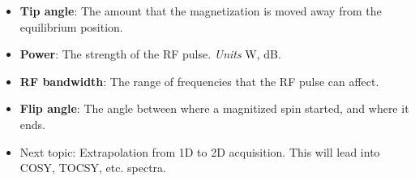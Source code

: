 \documentclass[../notes.tex]{subfiles}
\begin{document}
\begin{itemize}
\begin{itemize}
\begin{itemize}
        \end{itemize}
        \item RF pulses are defined by their \textbf{frequency}, \textbf{tip angle}, \textbf{power}, \textbf{RF bandwidth}, and \textbf{phase}.
        \item When we apply a strong pulse, it excites a wide bandwidth. Weak pulses, on the contrary, excite a narrow bandwidth.
        \item Relaxation and frequency are inversely proportional: When we pulse a system in the ultraviolet or visible, it relaxes in \si{\nano\second}, \si{\pico\second}, \si{\femto\second}. When we pulse a system with RF, it decays in the \si{\milli\second} to \si{\second} range.
        \begin{itemize}
            \item Thus, we have time to do a whole bunch of stuff that we can't do, unless we're in the Schlau-Cohen lab and have really fancy equipment.
        \end{itemize}
        \item You can do solvent suppression by dialing in a pulse of the certain power that you need.
    \end{itemize}
    \item \textbf{Tip angle}: The amount that the magnetization is moved away from the equilibrium position.
    \item \textbf{Power}: The strength of the RF pulse. \emph{Units} \si{\watt}, \si{\deci\bel}.
    \item \textbf{RF bandwidth}: The range of frequencies that the RF pulse can affect.
    \item \textbf{Flip angle}: The angle between where a magnitized spin started, and where it ends.
    \item Next topic: Extrapolation from 1D to 2D acquisition. This will lead into COSY, TOCSY, etc. spectra.
\end{itemize}
\end{document}
